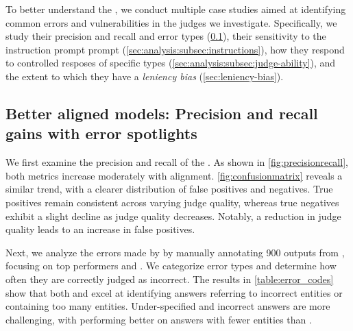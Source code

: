 To better understand the \judgemodels, we conduct multiple case studies aimed at identifying common errors and vulnerabilities in the judges we investigate.
Specifically, we study their precision and recall and error types (\cref{sec:analysis:subsec:precision_recall}), their sensitivity to the instruction prompt prompt (\cref{sec:analysis:subsec:instructions}), how they respond to controlled resposes of specific types (\cref{sec:analysis:subsec:judge-ability}), and the extent to which they have a \textit{leniency bias} (\cref{sec:leniency-bias}).

\subsection{Better aligned models: Precision and recall gains with error spotlights}
\label{sec:analysis:subsec:precision_recall}

We first examine the precision and recall of the \judgemodels. As shown in \cref{fig:precisionrecall}, both metrics increase moderately with alignment. \cref{fig:confusionmatrix} reveals a similar trend, with a clearer distribution of false positives and negatives. True positives remain consistent across varying judge quality, whereas true negatives exhibit a slight decline as judge quality decreases. Notably, a reduction in judge quality leads to an increase in false positives.


Next, we analyze the errors made by \judgemodels by manually annotating 900 outputs from , focusing on top performers \judge{\gpt} and . We categorize error types and determine how often they are correctly judged as incorrect. The results in \cref{table:error_codes} show that both \judge{\gpt} and  excel at identifying answers referring to incorrect entities or containing too many entities. Under-specified and incorrect answers are more challenging, with \judge{\gpt} performing better on answers with fewer entities than .

